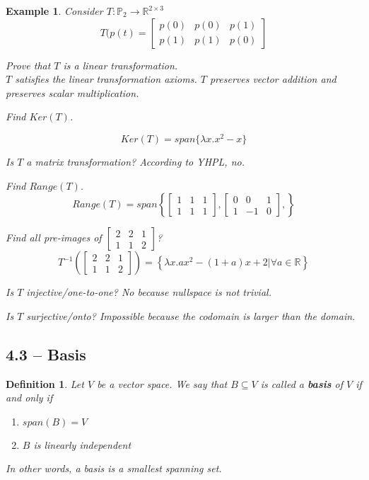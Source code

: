 \documentclass[11pt]{article}
\newtheorem{defn}{Definition}
\newtheorem{ex}{Example}
\begin{document}
\begin{ex}
  Consider $T : \mathbb{P}_{2}  \to \mathbb{R}^{2 \times 3}$
  \[T(p(t) = \begin{bmatrix} p(0) & p(0) & p(1) \\ p(1) & p(1) & p(0) \end{bmatrix}\]

  Prove that $T$ is a linear transformation. \\
  $T$ satisfies the linear transformation axioms. $T$ preserves vector addition and preserves scalar multiplication.

  Find $Ker(T)$.

  \[Ker(T) = span \{ \lambda x. x^{2} - x \}\]

  Is $T$ a matrix transformation? According to YHPL, no.

  Find $Range(T)$.
  \[Range(T) = span \left\{ \begin{bmatrix} 1 & 1 & 1 \\ 1 & 1 & 1 \end{bmatrix}, \begin{bmatrix} 0 & 0 & 1 \\ 1 & -1 & 0 \end{bmatrix}, \right\}\]

  Find all pre-images of $\begin{bmatrix} 2 & 2 & 1 \\ 1 & 1 & 2 \end{bmatrix}$?
  \[T^{-1}(\begin{bmatrix} 2 & 2 & 1 \\ 1 & 1 & 2 \end{bmatrix}) = \left\{ \lambda x. ax^{2}- (1 + a) x + 2 | \forall a \in \mathbb{R}\right\}\]


  Is $T$ injective/one-to-one? No because nullspace is not trivial.


  Is $T$ surjective/onto? Impossible because the codomain is larger than the domain.

\end{ex}
\subsection{4.3 -- Basis}

\begin{defn}
  Let $V$ be a vector space. We say that $B \subseteq V$ is called a \textbf{basis} of $V$ if and only if
  \begin{enumerate}
    \item $span(B) = V$
    \item $B$ is linearly independent
  \end{enumerate}
  In other words, a basis is a smallest spanning set.
\end{defn}
\end{document}
